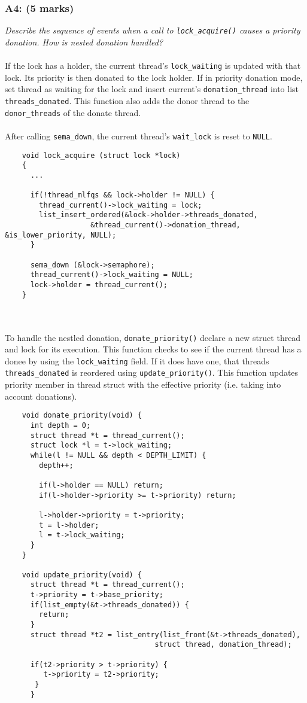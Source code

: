 \documentclass{article}
\begin{document}
\subsubsection*{A4: (5 marks) }
\textit{Describe the sequence of events when a call to \texttt{lock\_acquire()} causes a priority donation. How is nested donation handled?}
\\ \\
If the lock has a holder, the current thread's \texttt{lock\_waiting} is updated with that lock.
Its priority is then donated to the lock holder. If in priority donation mode, set thread as waiting for the lock and insert current's \texttt{donation\_thread} into list \texttt{threads\_donated}. This function also adds the donor thread to
the \texttt{donor\_threads} of the donate thread.
\\ \\
After calling \texttt{sema\_down}, the current thread's \texttt{wait\_lock} is reset to \texttt{NULL}.

\begin{lstlisting}
    void lock_acquire (struct lock *lock)
    {
      ...

      if(!thread_mlfqs && lock->holder != NULL) {
        thread_current()->lock_waiting = lock;
        list_insert_ordered(&lock->holder->threads_donated,
                    &thread_current()->donation_thread, &is_lower_priority, NULL);
      }

      sema_down (&lock->semaphore);
      thread_current()->lock_waiting = NULL;
      lock->holder = thread_current();
    }
\end{lstlisting}
\\ \\
To handle the nestled donation, \texttt{donate\_priority()} declare a new struct thread and lock for  its execution. This function checks to see if the current thread has a donee by
using the \texttt{lock\_waiting} field. If it does have one, that threads \texttt{threads\_donated}
is reordered using \texttt{update\_priority()}. This function updates priority member in thread struct with the effective priority (i.e. taking into account donations).

\begin{lstlisting}
    void donate_priority(void) {
      int depth = 0;
      struct thread *t = thread_current();
      struct lock *l = t->lock_waiting;
      while(l != NULL && depth < DEPTH_LIMIT) {
        depth++;

        if(l->holder == NULL) return;
        if(l->holder->priority >= t->priority) return;

        l->holder->priority = t->priority;
        t = l->holder;
        l = t->lock_waiting;
      }
    }

    void update_priority(void) {
      struct thread *t = thread_current();
      t->priority = t->base_priority;
      if(list_empty(&t->threads_donated)) {
        return;
      }
      struct thread *t2 = list_entry(list_front(&t->threads_donated),
                                   struct thread, donation_thread);

      if(t2->priority > t->priority) {
         t->priority = t2->priority;
       }
      }
\end{lstlisting}
\end{document}
